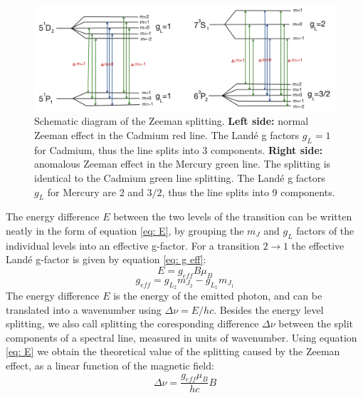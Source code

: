 \documentclass[11pt]{article}
\begin{document}
\begin{figure}[h!]
    \centering
    \includegraphics[width=\linewidth]{Energy levels2.jpeg}
    \captionsetup{justification=centering}
    \caption{Schematic diagram of the Zeeman splitting. 
    \textbf{Left side:} normal Zeeman effect in the Cadmium red line. The Landé g factors $g_L = 1$ for Cadmium, thus the line splits into 3 components. 
    \textbf{Right side:} anomalous Zeeman effect in the Mercury green line. The splitting is identical to the Cadmium green line splitting. The Landé g factors $g_L$ for Mercury are $2$ and $3/2$, thus the line splits into 9 components. }
    \label{fig: energy levels}
\end{figure}
The energy difference $E$ between the two levels of the transition can be written neatly in the form of equation \eqref{eq: E}, by grouping the $m_J$ and $g_L$ factors of the individual levels into an effective g-factor. For a transition $2 \rightarrow 1$ the effective Landé g-factor is given by equation \eqref{eq: g eff}: 
\begin{equation}
    E = g_{eff} B \mu_B \label{eq: E}
\end{equation}
\begin{equation}
    g_{eff} = g_{L_2} m_{J_2} - g_{L_1} m_{J_1} \label{eq: g eff}
\end{equation}
The energy difference $E$ is the energy of the emitted photon, and can be translated into a wavenumber using $\Delta \nu = E / hc$. Besides the energy level splitting, we also call splitting the coresponding difference $\Delta \nu$ between the split components of a spectral line, measured in units of wavenumber. Using equation \eqref{eq: E} we obtain the theoretical value of the splitting caused by the Zeeman effect, as a linear function of the magnetic field: 
\begin{equation}
    \Delta \nu = \frac{g_{eff} \mu_B}{hc} B
    \label{eq: splitting}
\end{equation}


\end{document}
